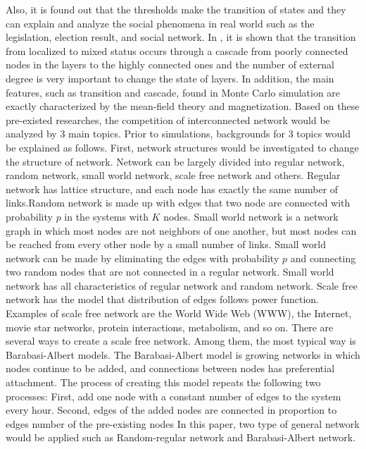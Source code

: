 Also, it is found out that the thresholds make the transition of states and they can explain and analyze the social phenomena in real world such as the legislation, election result, and social network.\parencite{alvarez2016, amato2017, diep2017} In \parencite{gomez2015}, it is shown that the transition from localized to mixed status occurs through a cascade from poorly connected nodes in the layers to the highly connected ones and the number of external degree is very important to change the state of layers.\parencite{gomez2015} In addition, the main features, such as transition and cascade, found in Monte Carlo simulation are exactly characterized by the mean-field theory and magnetization\parencite{alvarez2016, diep2017, amato2017, gomez2015}. 
Based on these pre-existed researches, the competition of interconnected network would be analyzed by 3 main topics. Prior to simulations, backgrounds for 3 topics would be explained as follows. 
First,  network structures would be investigated to change the structure of network. Network can be largely divided into regular network, random network\parencite{erdos1960}, small world network\parencite{watts1998}, scale free network\parencite{barabasi1999} and others. Regular network has lattice structure, and  each node has exactly the same number of links.Random network is made up with edges that two node are connected with probability $p$ in the systems with $K$ nodes. 
Small world network is a network graph in which most nodes are not neighbors of one another, but most nodes can be reached from every other node by a small number of links. Small world network can be made by eliminating the edges with probability $p$ and connecting two random nodes that are not connected in a regular network. Small world network has all characteristics of regular network and random network.
Scale free network has the model that distribution of edges follows power function. Examples of scale free network are the World Wide Web (WWW), the Internet, movie star networks, protein interactions, metabolism, and so on.
There are several ways to create a scale free network. Among them, the most typical way is Barabasi-Albert models.
The Barabasi-Albert model is growing networks in which nodes continue to be added, and connections between nodes has preferential attachment. The process of creating this model repeats the following two processes: First, add one node with a constant number of edges to the system every hour. Second, edges of the added nodes are connected in proportion to edges number of the pre-existing nodes
In this paper, two type of general network would be applied such as Random-regular network and Barabasi-Albert network. 

